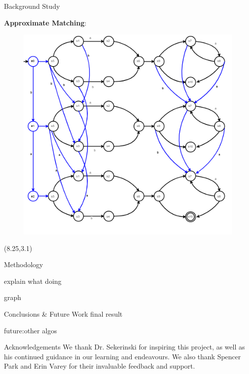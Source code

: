 \documentclass[22pt]{beamer}
\begin{document}
\begin{frame}[fragile]
\begin{textblock}{7.25}
\begin{block}{Background Study}
\vspace{5mm} %



\textbf{Approximate Matching}:


\begin{figure}
\includegraphics[scale=2]{MillerAndMyersAlgorithm.PNG}
\end{figure}

\end{block}
\end{textblock}


\begin{textblock}{7.25}(8.25,3.1)
\begin{block}{Methodology}

explain what doing

graph

\end{block}


\begin{block}{Conclusions \& Future Work}
final result

future:other algos
\end{block}


\begin{block}{Acknowledgements}
We thank Dr. Sekerinski for inspiring this project, as well as his continued guidance in our learning and endeavours. We also thank Spencer Park and Erin Varey for their invaluable feedback and support. 
\end{block}


\end{textblock}
\end{frame}
\end{document}
